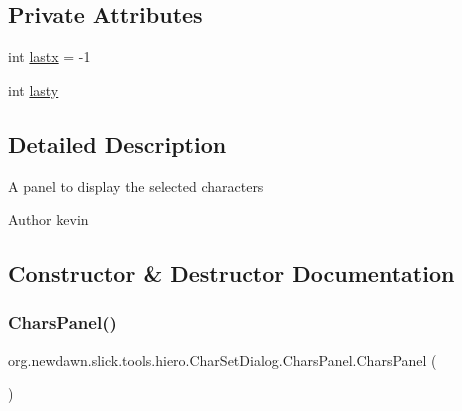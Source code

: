 \subsection*{Private Attributes}
\begin{DoxyCompactItemize}
\item 
int \mbox{\hyperlink{classorg_1_1newdawn_1_1slick_1_1tools_1_1hiero_1_1_char_set_dialog_1_1_chars_panel_a62f78e56cfdd467324c652b5483a8ad5}{lastx}} = -\/1
\item 
int \mbox{\hyperlink{classorg_1_1newdawn_1_1slick_1_1tools_1_1hiero_1_1_char_set_dialog_1_1_chars_panel_ac833851797df74ed3d3d43dacdd44d6a}{lasty}}
\end{DoxyCompactItemize}


\subsection{Detailed Description}
A panel to display the selected characters

\begin{DoxyAuthor}{Author}
kevin 
\end{DoxyAuthor}


\subsection{Constructor \& Destructor Documentation}
\mbox{\label{classorg_1_1newdawn_1_1slick_1_1tools_1_1hiero_1_1_char_set_dialog_1_1_chars_panel_af2595520765209ef657358867ab6e971}} 
\subsubsection{\texorpdfstring{Chars\+Panel()}{CharsPanel()}}
{\footnotesize\ttfamily org.\+newdawn.\+slick.\+tools.\+hiero.\+Char\+Set\+Dialog.\+Chars\+Panel.\+Chars\+Panel (\begin{DoxyParamCaption}{ }\end{DoxyParamCaption})\hspace{0.3cm}{\ttfamily [inline]}}

